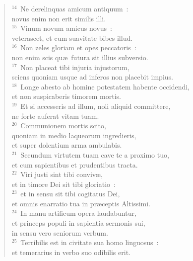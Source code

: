 \begin{verse}${}^{14}$~Ne derelinquas amicum antiquum~:\\ novus enim non erit similis illi.\\
${}^{15}$~Vinum novum amicus novus~:\\ veterascet, et cum suavitate bibes illud.\\
${}^{16}$~Non zeles gloriam et opes peccatoris~:\\ non enim scis qu\ae\ futura sit illius subversio.\\
${}^{17}$~Non placeat tibi injuria injustorum,\\ sciens quoniam usque ad inferos non placebit impius.\\
${}^{18}$~Longe abesto ab homine potestatem habente occidendi,\\ et non suspicaberis timorem mortis.\\
${}^{19}$~Et si accesseris ad illum, noli aliquid committere,\\ ne forte auferat vitam tuam.\\
${}^{20}$~Communionem mortis scito,\\ quoniam in medio laqueorum ingredieris,\\ et super dolentium arma ambulabis.\\
${}^{21}$~Secundum virtutem tuam cave te a proximo tuo,\\ et cum sapientibus et prudentibus tracta.\\
${}^{22}$~Viri justi sint tibi conviv\ae ,\\ et in timore Dei sit tibi gloriatio~:\\
${}^{23}$~et in sensu sit tibi cogitatus Dei,\\ et omnis enarratio tua in pr\ae ceptis Altissimi.\\
${}^{24}$~In manu artificum opera laudabuntur,\\ et princeps populi in sapientia sermonis sui,\\ in sensu vero seniorum verbum.\\
${}^{25}$~Terribilis est in civitate sua homo linguosus~:\\ et temerarius in verbo suo odibilis erit.\end{verse}


